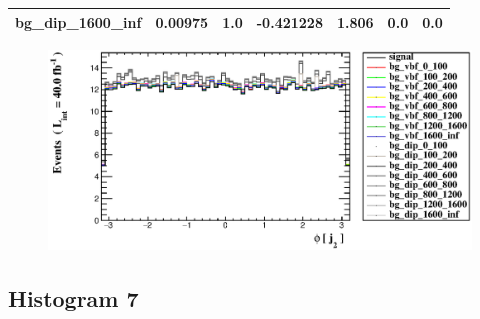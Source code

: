 \documentclass[a4paper, 10pt]{article}
\begin{document}
\begin{table}[H]
\begin{center}
\begin{tabular}{|m{23.0mm}|m{23.0mm}|m{18.0mm}|m{19.0mm}|m{19.0mm}|m{19.0mm}|m{19.0mm}|}
      \hline
      {\cellcolor{white}         bg\_dip\_1600\_inf}& {\cellcolor{white}         0.00975}& {\cellcolor{white}         1.0}& {\cellcolor{white}         -0.421228}& {\cellcolor{white}         1.806}& {\cellcolor{green}         0.0}& {\cellcolor{green}         0.0}\\
\hline
    \end{tabular}
  \end{center}
\end{table}

\begin{figure}[H]
  \begin{center}
    \includegraphics[scale=0.45]{selection_5.eps}\\
\caption{   }
  \end{center}
\end{figure}
      \newpage
\subsection{ Histogram 7}
\end{document}
